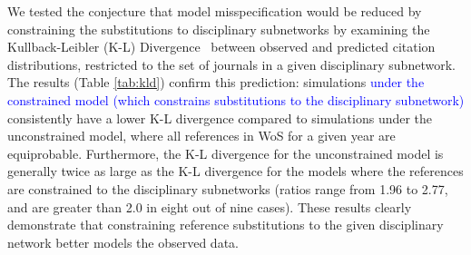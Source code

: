 \documentclass[NETN]{stjour}
\begin{document}
 We tested the conjecture that model misspecification would be reduced by constraining the substitutions to  disciplinary subnetworks by examining the Kullback-Leibler (K-L) Divergence~\citep{kullback_information_1951} between observed and predicted citation distributions, restricted to  the set of journals in a given disciplinary subnetwork.  The results (Table \ref{tab:kld}) confirm this prediction: simulations \textcolor{blue}{under the constrained model (which constrains substitutions to the
disciplinary subnetwork)} consistently have a lower K-L divergence compared to simulations under the unconstrained model,  where all references in WoS for a given year are equiprobable. Furthermore, the K-L divergence for  the unconstrained model is generally twice as large as the K-L divergence for the models where the references are constrained to  the disciplinary subnetworks (ratios range from 1.96 to 2.77,  and are greater than 2.0 in eight out of nine cases).
These results clearly demonstrate that constraining reference substitutions to the given disciplinary network better models the observed data.
\end{document}
